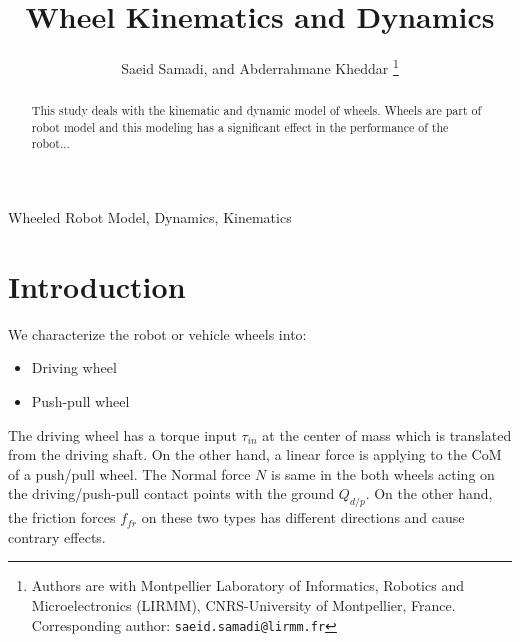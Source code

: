 \documentclass[letterpaper, 10pt, conference]{ieeeconf}
\title{\Large \bf
	Wheel Kinematics and Dynamics}
\author{Saeid Samadi, and Abderrahmane Kheddar
	\thanks{Authors are with Montpellier Laboratory of Informatics,
		Robotics and Microelectronics (LIRMM), CNRS-University of Montpellier, France.
		Corresponding author: {\tt\footnotesize saeid.samadi@lirmm.fr}}
}
\begin{document}
\maketitle
\thispagestyle{empty}
\pagestyle{empty}

\begin{abstract}
	This study deals with the kinematic and dynamic model of wheels. Wheels are part of robot model and this modeling has a significant effect in the performance of the robot...
\end{abstract}

\begin{keywords}
	Wheeled Robot Model, Dynamics, Kinematics
\end{keywords}

	

\section{Introduction} \label{Sec_Introduction}

We characterize the robot or vehicle wheels into:
\begin{itemize}
	\item Driving wheel
	\item Push-pull wheel
\end{itemize}

The driving wheel has a torque input $\tau_{in}$ at the center of mass which is translated from the driving shaft. On the other hand, a linear force is applying to the CoM of a push/pull wheel. The Normal force $N$ is same in the both wheels acting on the driving/push-pull contact points with the ground $Q_{d/p}$. On the other hand, the friction forces $f_{fr}$ on these two types has different directions and cause contrary effects.
\end{document}
